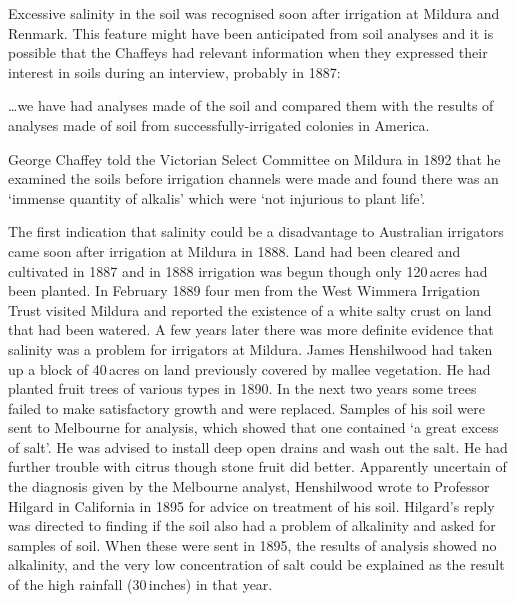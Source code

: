 Excessive salinity in the soil was recognised soon
after irrigation at Mildura and Renmark.  This feature might have been
anticipated from soil analyses  and it is
possible that the Chaffeys had relevant information when they
expressed their interest in soils during an interview, probably in
1887:
\begin{Quote}
	\ldots we have had analyses made of the soil and compared them
	with the results of analyses made of soil from
	successfully-irrigat\-ed colonies in
	America.
\end{Quote}
George Chaffey told the Victorian Select Committee on Mildura in 1892
that he examined the soils before irrigation
channels were made and found
there was an `immense quantity of alkalis' which
were `not injurious to plant life'.

The first indication that salinity could be a
disadvantage to Australian irrigators came soon after irrigation at
Mildura  in 1888.  Land had been cleared and
cultivated in 1887 and in 1888 irrigation was begun though only
120\,acres had been planted.  In February 1889 four men from the West
Wimmera Irrigation Trust  visited
Mildura and reported the existence of a white salty crust on land that
had been watered. A few years later there was more definite evidence
that salinity  was a problem for irrigators at
Mildura. James Henshilwood   had taken up a
block of 40\,acres on land previously covered by mallee 
vegetation.  He had planted fruit trees of various types
in 1890.  In the next two years some trees failed to make satisfactory
growth and were replaced.  Samples of his soil were sent to Melbourne
for analysis, which showed that one contained `a great excess of
salt'.  He was advised to install deep open drains and wash out the
salt.  He had further trouble with citrus though stone
fruit did better.  Apparently uncertain of the diagnosis
given by the Melbourne analyst, Henshilwood wrote to Professor Hilgard
in California in 1895 for advice on treatment of his
soil.  Hilgard's reply was directed to finding if the soil also had a
problem of alkalinity and asked for samples of soil.  When these were
sent in 1895, the results of analysis showed no alkalinity,
 and the very low concentration of salt could be
explained as the result of the high rainfall (30\,inches) in that
year.

